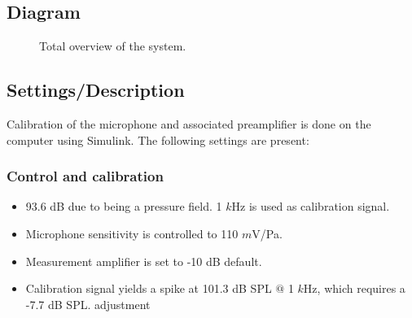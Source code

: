 \subsection{Diagram}


\begin{figure}[H]
	\centering
	
	\caption{Total overview of the system.}
	\label{SchematicOverviewHP}
\end{figure}
\subsection{Settings/Description}
\label{SettingsHeadPhones}
Calibration of the microphone and associated preamplifier is done on the computer using Simulink. The following settings are present:

\subsubsection{Control and calibration}
\begin{itemize}
	\item 93.6 dB due to being a pressure field. 1 $k$Hz is used as calibration signal. %
	\item Microphone sensitivity is controlled to 110 $m$V/Pa.
	\item Measurement amplifier is set to -10 dB default.
	\item Calibration signal yields a spike at 101.3 dB SPL $@$ 1 $k$Hz, which requires a -7.7 dB SPL. adjustment
\end{itemize}
